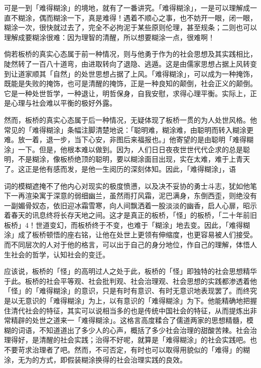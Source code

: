 可是一到「难得糊涂」的境地，就有了一番讲究。「难得糊涂」，一是可以理解成一直不糊涂，偶而糊涂一下，真是难得！遇着不顺心之事，也不妨开一眼，闭一眼，糊涂一次，很快就过去了，完全不必拘泥于某些原则伦理，甚至规条；二则也可以理解成要糊涂很难：因为理智的清醒，所以想要糊涂一点，很难啊！

倘若板桥的真实心态属于前一种情况，则与他勇于作为的社会思想及其实践相比，陡然转了一百八十道弯，由进取转向了退隐、逃遁。这是由儒家思想占据上风转变到让道家顺其「自然」的处世思想占据了上风。「难得糊涂」，可以成为一种掩饰，既能是失败的掩饰，也可是清醒的掩饰，正是一种良知的颠倒，社会正义的颠倒。它是一种处世哲学，一种退让，明哲保身，自我安慰，求得心理平衡。实际上，正是心理与社会难以平衡的极好外露。

然而，板桥的真实心态属于后一种情况，无疑体现了板桥一贯的为人处世风格。他常见的「难得糊涂」条幅注脚清楚地说：「聪明难，糊涂难，由聪明而转入糊涂更难。放一着，退一步，当下心安，非图后来福报也。」他寄望的是由聪明「难得糊涂」一下。但是，他根本难以做到。因为，人们日日夜夜世世代代企求的总是聪明，不是糊涂，像板桥绝顶的聪明，要以糊涂面目出现，实在太难，难于上青天了。这正是他有感而发，是他一生阅历的深刻体知。因此，「难得糊涂」，语

\vfill
\begin{BookNotes}
\end{BookNotes}

\noindent 词的模糊遮掩不了他内心对现实的极度愤懑，以及决不妥协的勇士斗志，犹如他笔下一再渲染寓于深意的弱细幽兰，虽然雨打风霜，泥巴满身，东倒西歪，则绝没有一副媚骨奴态，依旧迎冰霜雪寒，向人间飘洒着一股淡淡的幽香，启人心扉，昭示着春天的讯息终将长存天地之间。这才是真正的板桥，「怪」的板桥，「二十年前旧板桥」4！世道变幻，而板桥终于不变，也难于「糊涂」地去变。因此，「难得糊涂」成了板桥顿悟的座右铭，让他在处世上更领有伸缩度，也更容易被人们接受。而不同层次的人对于他的格言，可以出于自己的身分地位，作自己的理解，体悟人生社会的哲学，认知社会的变迁。

应该说，板桥的「怪」的高明过人之处于此，板桥的「怪」即独特的社会思想精华于此。板桥的社会平等观、社会批判观、社会治理观、社会思想的实践都渗透着他「怪」的「难得糊涂」的意识，只是有时有意识、有时无意识地表现罢了。而终究是以无意识的「难得糊涂」为上，以有意识的「难得糊涂」为下。他能精确地把握住清代社会的特征，其实可以说相当多的也是传统中国社会的特征，从而提炼出非常精辟的处世之道来一「难得糊涂」。这格言高度糅合了儒道两家的思想精髓，模糊的词语，不知道道出了多少人的心声，概括了多少社会治理的甜酸苦辣。社会治理得好，是清醒的社会实践；治得不好呢，就算是「难得糊涂」的社会实践吧。也不要苛求治理者了吧。然而，不可否定，有时也可以取得用貌似的「难得」的糊涂，无为的方式，即假装糊涂换得的社会治理实践的良效。

